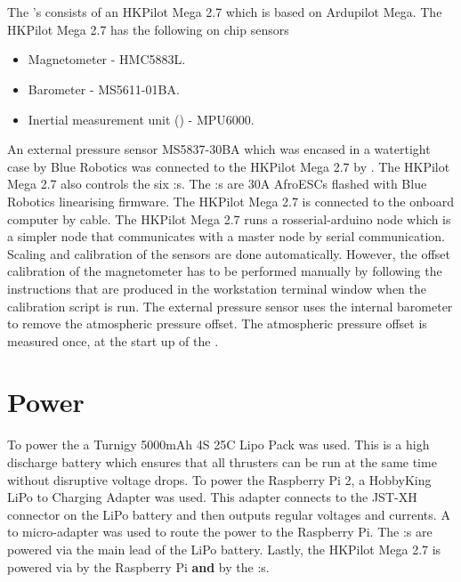 \section{\abbrROV \abbrIO}
The \abbrROV's \abbrIO consists of an HKPilot Mega 2.7 which is based on Ardupilot Mega. The HKPilot Mega 2.7 has the following on chip sensors
\begin{itemize}
    \item Magnetometer - HMC5883L.
    \item Barometer - MS5611-01BA.
    \item Inertial measurement unit (\abbrIMU) - MPU6000.
\end{itemize}
An external pressure sensor MS5837-30BA which was encased in a watertight case by Blue Robotics was connected to the HKPilot Mega 2.7 by \abbrIC.
The HKPilot Mega 2.7 also controls the six \abbrESC:s. The \abbrESC:s are 30A AfroESCs flashed with Blue Robotics linearising firmware. The HKPilot Mega 2.7 is connected to the onboard computer by \abbrUSB cable. The HKPilot Mega 2.7 runs a rosserial-arduino node which is a simpler \abbrROS node that communicates with a master node by serial communication. Scaling and calibration of the sensors are done automatically. However, the offset calibration of the magnetometer has to be performed manually by following the instructions that are produced in the workstation terminal window when the calibration script is run. The external pressure sensor uses the internal barometer to remove the atmospheric pressure offset. The atmospheric pressure offset is measured once, at the start up of the \abbrROV.

\section{Power}
To power the \abbrROV a Turnigy 5000mAh 4S 25C Lipo Pack was used. This is a high discharge battery which ensures that all thrusters can be run at the same time without disruptive voltage drops.
To power the Raspberry Pi 2, a HobbyKing LiPo to \abbrUSB Charging Adapter was used. This adapter connects to the JST-XH connector on the LiPo battery and then outputs regular \abbrUSB voltages and currents. A \abbrUSB to micro-\abbrUSB adapter was used to route the power to the Raspberry Pi. 
The \abbrESC:s are powered via the main lead of the LiPo battery. Lastly, the HKPilot Mega 2.7 is powered via \abbrUSB by the Raspberry Pi \textbf{and} by the \abbrESC:s. 

